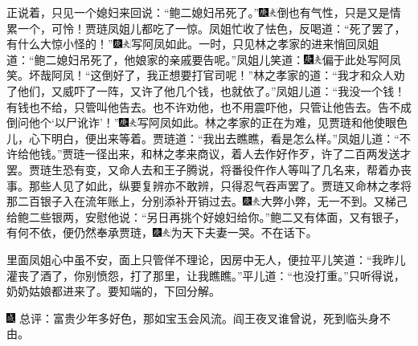 正说着，只见一个媳妇来回说：“鲍二媳妇吊死了。”{\includegraphics[width=3mm]{../Images/00004}\includegraphics[width=3mm]{../Images/00012}\footnotesize \kaishu 倒也有气性，只是又是情累一个，可怜！}贾琏凤姐儿都吃了一惊。凤姐忙收了怯色，反喝道：“死了罢了，有什么大惊小怪的！”{\includegraphics[width=3mm]{../Images/00004}\includegraphics[width=3mm]{../Images/00012}\footnotesize \kaishu 写阿凤如此。}一时，只见林之孝家的进来悄回凤姐道：“鲍二媳妇吊死了，他娘家的亲戚要告呢。”凤姐儿笑道：{\includegraphics[width=3mm]{../Images/00004}\includegraphics[width=3mm]{../Images/00012}\footnotesize \kaishu 偏于此处写阿凤笑。坏哉阿凤！}“这倒好了，我正想要打官司呢！”林之孝家的道：“我才和众人劝了他们，又威吓了一阵，又许了他几个钱，也就依了。”凤姐儿道：“我没一个钱！有钱也不给，只管叫他告去。也不许劝他，也不用震吓他，只管让他告去。告不成倒问他个‘以尸讹诈’！”{\includegraphics[width=3mm]{../Images/00004}\includegraphics[width=3mm]{../Images/00012}\footnotesize \kaishu 写阿凤如此。}林之孝家的正在为难，见贾琏和他使眼色儿，心下明白，便出来等着。贾琏道：“我出去瞧瞧，看是怎么样。”凤姐儿道：“不许给他钱。”贾琏一径出来，和林之孝来商议，着人去作好作歹，许了二百两发送才罢。贾琏生恐有变，又命人去和王子腾说，将番役仵作人等叫了几名来，帮着办丧事。那些人见了如此，纵要复辨亦不敢辨，只得忍气吞声罢了。贾琏又命林之孝将那二百银子入在流年账上，分别添补开销过去。{\includegraphics[width=3mm]{../Images/00004}\includegraphics[width=3mm]{../Images/00012}\footnotesize \kaishu 大弊小弊，无一不到。}又梯己给鲍二些银两，安慰他说：“另日再挑个好媳妇给你。”鲍二又有体面，又有银子，有何不依，便仍然奉承贾琏，{\includegraphics[width=3mm]{../Images/00004}\includegraphics[width=3mm]{../Images/00012}\footnotesize \kaishu 为天下夫妻一哭。}不在话下。

里面凤姐心中虽不安，面上只管佯不理论，因房中无人，便拉平儿笑道：“我昨儿灌丧了酒了，你别愤怨，打了那里，让我瞧瞧。”平儿道：“也没打重。”只听得说，奶奶姑娘都进来了。要知端的，下回分解。

{\includegraphics[width=3mm]{../Images/00005}  \kaishu 总评：富贵少年多好色，那如宝玉会风流。阎王夜叉谁曾说，死到临头身不由。}